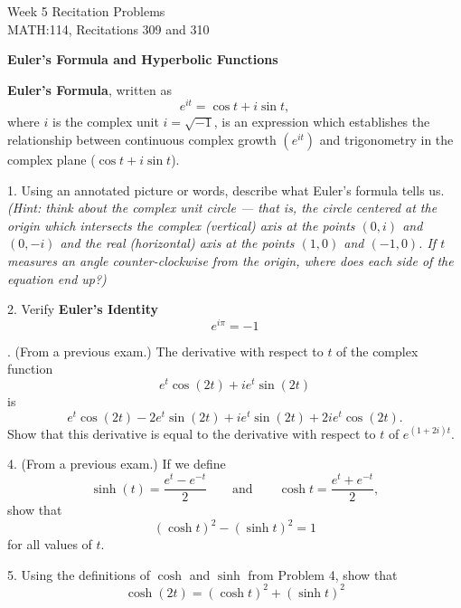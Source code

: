 \documentclass[11pt]{article}
\begin{document}
	{
		\centering
		\huge{Week 5 Recitation Problems} \\
		\Large{MATH:114, Recitations 309 and 310} \\
	}
	\vspace{3em}
	
	{
		\centering
		\large{\textbf{Euler's Formula and Hyperbolic Functions}} \\
	}
	\vspace{3em}
	
	\textbf{Euler's Formula}, written as $$ e^{it} = \cos t + i \sin t, $$ where $i$ is the complex unit $i = \sqrt{-1}$, is an expression which establishes the relationship between continuous complex growth $(e^{it})$ and trigonometry in the complex plane ($\cos t + i \sin t$).
	
	\vspace{3em}
	
	1. Using an annotated picture or words, describe what Euler's formula tells us. \textit{(Hint: think about the complex unit circle --- that is, the circle centered at the origin which intersects the complex (vertical) axis at the points $(0,i)$ and $(0, -i)$ and the real (horizontal) axis at the points $(1,0)$ and $(-1, 0)$. If $t$ measures an angle counter-clockwise from the origin, where does each side of the equation end up?)}
	
	\vspace{0.25\textheight}
	2. Verify \textbf{Euler's Identity} $$ e^{i \pi} = -1$$
	
	. (From a previous exam.) The derivative with respect to $t$ of the complex function $$e^t \cos(2t) + ie^t \sin(2t)$$ is $$ e^t \cos (2t) - 2e^t\sin(2t) + ie^t\sin(2t) + 2ie^t\cos(2t). $$ Show that this derivative is equal to the derivative with respect to $t$ of $e^{(1+2i)t}.$
	
	\vspace{0.2\textheight}
	4. (From a previous exam.) If we define $$\sinh(t) = \frac{e^t-e^{-t}}{2} \hspace{2em} \text{and} \hspace{2em} \cosh{t} = \frac{e^t+e^{-t}}{2},$$
	show that $$ (\cosh{t})^2 - (\sinh t)^2 = 1 $$ for all values of $t$.
	
	\vspace{0.2\textheight}
	5. Using the definitions of $\cosh$ and $\sinh$ from Problem 4, show that $$\cosh(2t) = (\cosh t)^2 + (\sinh t)^2$$
	
\end{document}
